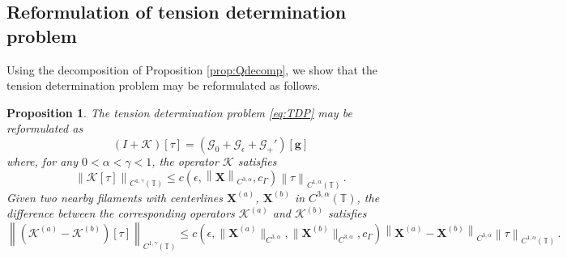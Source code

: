 \documentclass[11pt,reqno]{amsart}
\newcommand{\T}{\mathbb{T}}
\newcommand{\X}{\bm{X}}
\newcommand{\norm}[1]{\left\lVert #1 \right\rVert}
\newcommand{\mc}[1]{\mathcal{#1}}
\newtheorem{proposition}[theorem]{Proposition}
\theoremstyle{definition}
\begin{document}
\subsection{Reformulation of tension determination problem}\label{subsec:reform_TDP}
Using the decomposition of Proposition \ref{prop:Qdecomp}, we show that the tension determination problem may be reformulated as follows.
%
\begin{proposition}\label{prop:TDP_reform}
The tension determination problem \eqref{eq:TDP} may be reformulated as 
  \begin{equation}\label{eq:TDP_reform}
    (I +\mc{K})[\tau] = (\mc{G}_0+\mc{G}_\epsilon+\mc{G}_+')[\bm{g}]
  \end{equation}
where, for any $0<\alpha<\gamma<1$, the operator $\mc{K}$ satisfies
\begin{equation}
  \norm{\mc{K}[\tau]}_{C^{1,\gamma}(\T)} \le c(\epsilon,\norm{\X}_{C^{3,\alpha}},c_\Gamma)\norm{\tau}_{C^{1,\alpha}(\T)}\,.
\end{equation}
Given two nearby filaments with centerlines $\X^{(a)}$, $\X^{(b)}$ in $C^{3,\alpha}(\T)$, the difference between the corresponding operators $\mc{K}^{(a)}$ and $\mc{K}^{(b)}$ satisfies
\begin{equation}
  \norm{(\mc{K}^{(a)}-\mc{K}^{(b)})[\tau]}_{C^{1,\gamma}(\T)} \le c(\epsilon,\|\X^{(a)}\|_{C^{3,\alpha}},\|\X^{(b)}\|_{C^{3,\alpha}},c_\Gamma)\norm{\X^{(a)}-\X^{(b)}}_{C^{3,\alpha}}\norm{\tau}_{C^{1,\alpha}(\T)}\,.
\end{equation}


\end{proposition}
\end{document}
